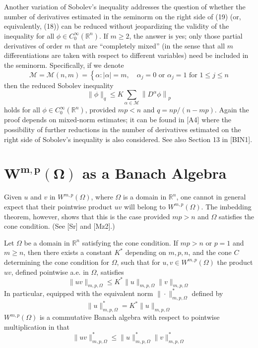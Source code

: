 \begin{para}
  Another variation of Sobolev's inequality addresses the question of whether the number of derivatives 
  estimated in the seminorm on the right side of (19) (or, equivalently, (18)) can be reduced without 
  jeopardizing the validity of the inequality for all $\phi \in C_0^{\infty}\left(\mathbb{R}^n\right)$.
  If $m \geq 2$, the answer is yes; only those partial derivatives of order $m$ that are ``completely mixed'' 
  (in the sense that all $m$ differentiations are taken with respect to different variables) need be included
  in the seminorm. Specifically, if we denote
  \[
  \mathcal{M}=\mathcal{M}(n, m)=\left\{\alpha:|\alpha|=m, \quad \alpha_j=0 \text { or } \alpha_j=1 \text { for } 1 \leq j \leq n\right.
  \]
  then the reduced Sobolev inequality
  \[
  \|\phi\|_q \leq K \sum_{\alpha \in \mathcal{M}}\left\|D^\alpha \phi\right\|_p
  \]
  holds for all $\phi \in C_0^{\infty}\left(\mathbb{R}^n\right)$, provided $m p<n$ and $q=n p /(n-m p)$.
  Again the proof depends on mixed-norm estimates; it can be found in [A4] where the possibility of
  further reductions in the number of derivatives estimated on the right side of Sobolev's
  inequality is also considered. See also Section 13 in [BIN1].
\end{para}


\section[$W^{m,p}(\Omega)$ as a Banach Algebra]%
  {$\bm{W^{m,p}(\Omega)}$ as a Banach Algebra}


\begin{para}
  Given $u$ and $v$ in $W^{m,p}(\Omega)$, where $\Omega$ is a domain in $\mathbb{R}^n$,
  one cannot in general expect that their pointwise product $u v$ will belong to $W^{m,p}(\Omega)$.
  The imbedding theorem, however, shows that this is the case provided $m p>n$ and $\Omega$
  satisfies the cone condition. (See [Sr] and [Mz2].)
\end{para}


\begin{theorem}
  Let $\Omega$ be a domain in $\mathbb{R}^n$ satisfying the cone condition.
  If $m p>n$ or $p=1$ and $m \geq n$, then there exists a constant $K^*$ depending on $m, p, n$,
  and the cone $C$ determining the cone condition for $\Omega$,
  such that for $u, v \in W^{m,p}(\Omega)$ the product $u v$, defined pointwise a.e. in $\Omega$, satisfies
  \[
  \|u v\|_{m, p, \Omega} \leq K^*\|u\|_{m, p, \Omega}\|v\|_{m, p, \Omega}
  \]
  In particular, equipped with the equivalent norm $\|\cdot\|_{m, p, \Omega}^*$ defined by
  \[
  \|u\|_{m, p, \Omega}^*=K^*\|u\|_{m, p, \Omega}
  \]
  $W^{m,p}(\Omega)$ is a commutative Banach algebra with respect to pointwise multiplication in that
  \[
  \|u v\|_{m, p, \Omega}^* \leq\|u\|_{m, p, \Omega}^*\|v\|_{m, p, \Omega}^*
  \]
\end{theorem}


